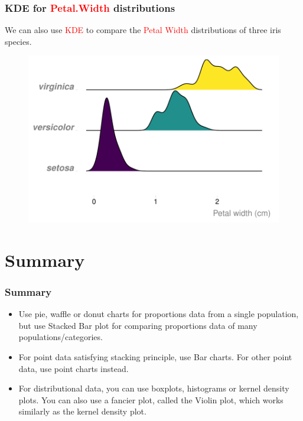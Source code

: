 \documentclass{beamer}
\begin{document}
\begin{frame}\frametitle{KDE for \textcolor{red}{Petal.Width} distributions}
We can also use \textcolor{red}{KDE} to compare the \textcolor{red}{Petal Width} distributions of three iris species.
\begin{figure}
\includegraphics[width=0.99\linewidth]{PlotsLec1/PetalWidthKDE}
\end{figure}
\end{frame}

\section{Summary}
\begin{frame}\frametitle{Summary}
\begin{itemize}
\item Use pie, waffle or donut charts for proportions data from a single population, but use Stacked Bar plot for comparing proportions data of many populations/categories.
\vspace{0.3in}

\item For point data satisfying stacking principle, use Bar charts. For other point data, use point charts instead.
\vspace{0.3in}

\item For distributional data, you can use boxplots, histograms or kernel density plots. You can also use a fancier plot, called the Violin plot, which works similarly as the kernel density plot.

\end{itemize}
\end{frame}


%
\end{document}
